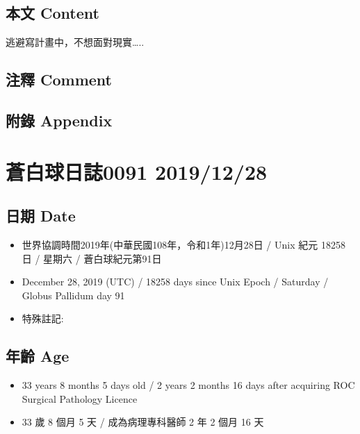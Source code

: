 \documentclass[a5paper, 12pt
]{book}
\providecommand{\tightlist}{%
  \setlength{\itemsep}{0pt}\setlength{\parskip}{0pt}}
\begin{document}
\hypertarget{ux672cux6587-content-26}{%
\subsection{本文 Content}\label{ux672cux6587-content-26}}

逃避寫計畫中，不想面對現實\ldots..

\hypertarget{ux6ce8ux91cb-comment-25}{%
\subsection{注釋 Comment}\label{ux6ce8ux91cb-comment-25}}

\hypertarget{ux9644ux9304-appendix-26}{%
\subsection{附錄 Appendix}\label{ux9644ux9304-appendix-26}}

\hypertarget{ux84bcux767dux7403ux65e5ux8a8c0091-20191228}{%
\section{蒼白球日誌0091
2019/12/28}\label{ux84bcux767dux7403ux65e5ux8a8c0091-20191228}}

\hypertarget{ux65e5ux671f-date-27}{%
\subsection{日期 Date}\label{ux65e5ux671f-date-27}}

\begin{itemize}
\tightlist
\item
  世界協調時間2019年(中華民國108年，令和1年)12月28日 / Unix 紀元 18258
  日 / 星期六 / 蒼白球紀元第91日
\item
  December 28, 2019 (UTC) / 18258 days since Unix Epoch / Saturday /
  Globus Pallidum day 91
\item
  特殊註記:
\end{itemize}

\hypertarget{ux5e74ux9f61-age-27}{%
\subsection{年齡 Age}\label{ux5e74ux9f61-age-27}}

\begin{itemize}
\tightlist
\item
  33 years 8 months 5 days old / 2 years 2 months 16 days after
  acquiring ROC Surgical Pathology Licence
\item
  33 歲 8 個月 5 天 / 成為病理專科醫師 2 年 2 個月 16 天
\end{itemize}
\end{document}
